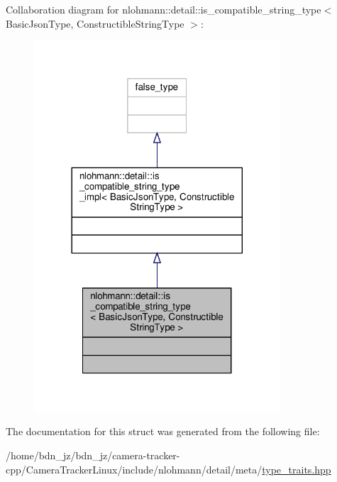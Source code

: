 Collaboration diagram for nlohmann\+:\+:detail\+:\+:is\+\_\+compatible\+\_\+string\+\_\+type$<$ Basic\+Json\+Type, Constructible\+String\+Type $>$\+:
\nopagebreak
\begin{figure}[H]
\begin{center}
\leavevmode
\includegraphics[width=260pt]{structnlohmann_1_1detail_1_1is__compatible__string__type__coll__graph}
\end{center}
\end{figure}


The documentation for this struct was generated from the following file\+:\begin{DoxyCompactItemize}
\item 
/home/bdn\+\_\+jz/bdn\+\_\+jz/camera-\/tracker-\/cpp/\+Camera\+Tracker\+Linux/include/nlohmann/detail/meta/\hyperlink{type__traits_8hpp}{type\+\_\+traits.\+hpp}\end{DoxyCompactItemize}

